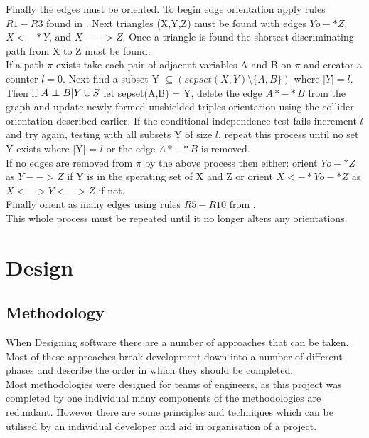 \documentclass{article}
\newcommand\independent{\protect\mathpalette{\protect\independenT}{\perp}}
\def\independenT#1#2{\mathrel{\rlap{$#1#2$}\mkern2mu{#1#2}}}
\begin{document}
Finally the edges must be oriented. To begin edge orientation apply rules $R1-R3$ found in \cite{ZHANG20081873}. Next triangles (X,Y,Z) must be found with edges $Yo-*Z$, $X<-*Y$, and $X-->Z$. Once a triangle is found the shortest discriminating path from X to Z must be found.
\\

If a path $\pi$ exists take each pair of adjacent variables A and B on $\pi$ and creator a counter $l = 0$. Next find  a subset Y  $\subseteq (sepset(X,Y) \setminus \{A,B\})$ where $|Y| = l$. Then if $A \independent B | Y \cup S$ let sepset(A,B) = Y, delete the edge $A*-*B$ from the graph and update newly formed unshielded triples orientation using the collider orientation described earlier. If the conditional independence test fails increment $l$ and try again, testing with all subsets Y of size $l$, repeat this process until no set Y exists where |Y| = $l$ or the edge $A*-*B$ is removed. 
\\

If no edges are removed from $\pi$ by the above process then either: orient $Yo-*Z$ as $Y-->Z$ if Y is in the sperating set of X and Z or orient $X<-*Yo-*Z$ as $X<->Y<->Z$ if not.
\\

Finally orient as many edges using rules $R5-R10$ from \cite{ZHANG20081873}.
\\

This whole process must be repeated until it no longer alters any orientations.\cite{colombo2012learning}

\section{Design}

\subsection{Methodology}
When Designing software there are a number of approaches that can be taken. Most of these approaches break development down into a number of different phases and describe the order in which they should be completed.\\

Most methodologies were designed for teams of engineers, as this project was completed by one individual many components of the methodologies are redundant. However there are some principles and techniques which can be utilised by an individual developer and aid in organisation of a project.
\end{document}
